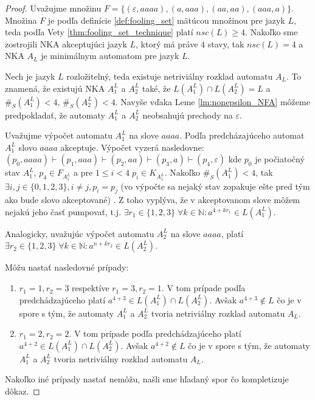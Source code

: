 \begin{proof}
Uvažujme množinu $ F = \lbrace (\varepsilon,aaaa),(a,aaa),(aa,aa),(aaa,a)\rbrace $. Množina $ F $ je podľa definície \ref{def:fooling_set} mätúcou množinou pre jazyk $ L $, teda podľa Vety \ref{thm:fooling_set_technique} platí $ nsc(L) \geq 4 $. Nakoľko sme zostrojili NKA akceptujúci jazyk $ L $, ktorý má práve $ 4 $ stavy, tak $ nsc(L) = 4 $ a NKA $ A_{L} $ je minimálnym automatom pre jazyk $ L $.
\par
Nech je jazyk $ L$ rozložitelný, teda existuje netriviálny rozklad automatu $ A_{L} $. To znamená, že existujú NKA $ A_1^{L} $ a $ A_2^{L} $ také, že $ L(A_1^{L}) \cap L(A_2^{L}) = L $ a $ \#_S(A_1^{L}) < 4 $, $ \#_S(A_2^{L}) < 4 $. Navyše vďaka Leme \ref{lm:nonepsilon_NFA} môžeme predpokladať, že automaty $ A_1^{L} $ a $ A_2^{L} $ neobsahujú prechody na $ \varepsilon $. 
\par
Uvažujme výpočet automatu $ A_1^{L} $ na slove $ aaaa $. Podľa predcházajúceho automat $ A_1^{L} $ slovo $ aaaa $ akceptuje. Výpočet vyzerá nasledovne: $ (p_0,aaaa) \vdash (p_1, aaa) \vdash (p_{2}, aa) \vdash (p_3, a) \vdash (p_4, \varepsilon) $ kde $ p_0 $ je počiatočný stav $ A_1^{L} $, $ p_4 \in F_{A_1^{L}} $ a pre $ 1 \leq i < 4 \; p_i \in K_{A_1^{L}}$. Nakoľko $ \#_S(A_1^{L}) < 4 $, tak $ \exists i,j \in \lbrace 0,1,2,3 \rbrace, i \neq j, p_i=p_j $ (vo výpočte sa nejaký stav zopakuje ešte pred tým ako bude slovo akceptované) . Z toho vyplýva, že v akceptovanom slove môžem nejakú jeho časť pumpovať, t.j. $ \exists r_1 \in \lbrace 1,2,3 \rbrace \; \forall k \in \mathbb{N}: a^{4 + kr_1} \in L(A_1^{L}) $.
\par
Analogicky, uvažujúc výpočet automatu $ A_2^{L} $ na slove $ aaaa $, platí $ \exists r_2 \in \lbrace 1,2,3 \rbrace \; \forall k \in \mathbb{N}: a^{n + kr_2} \in L(A_2^{L}) $.
\par
Môžu nastať nasledovné prípady:
\begin{enumerate}
\item $ r_1 = 1, r_2 = 3 $ respektíve $ r_1 = 3, r_2 = 1 $. V tom prípade podľa predchádzajúceho platí $ a^{4+3} \in L(A_1^{L}) \cap L(A_2^{L}) $. Avšak $ a^{4+3} \notin L $ čo je v spore s tým, že automaty $ A_1^{L} $ a $ A_2^{L} $ tvoria netriviálny rozklad automatu $ A_{L} $.
\item $ r_1 = 2, r_2 = 2 $. V tom prípade podľa predchádzajúceho platí $ a^{4+2} \in L(A_1^{L}) \cap L(A_2^{L}) $. Avšak $ a^{4+2} \notin L $ čo je v spore s tým, že automaty $ A_1^{L} $ a $ A_2^{L} $ tvoria netriviálny rozklad automatu $ A_{L} $.
\end{enumerate}
Nakoľko iné prípady nastať nemôžu, našli sme hľadaný spor čo kompletizuje dôkaz.
\end{proof}













